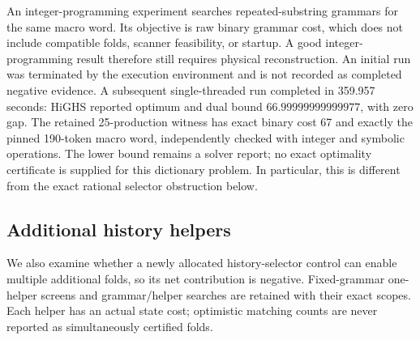 An integer-programming experiment searches repeated-substring grammars for the same macro word. Its objective is raw binary grammar cost, which does not include compatible folds, scanner feasibility, or startup. A good integer-programming result therefore still requires physical reconstruction. An initial run was terminated by the execution environment and is not recorded as completed negative evidence. A subsequent single-threaded run completed in 359.957 seconds: HiGHS reported optimum and dual bound $66.99999999999977$, with zero gap. The retained 25-production witness has exact binary cost 67 and exactly the pinned 190-token macro word, independently checked with integer and symbolic operations. The lower bound remains a solver report; no exact optimality certificate is supplied for this dictionary problem. In particular, this is different from the exact rational selector obstruction below.

\subsection{Additional history helpers}
We also examine whether a newly allocated history-selector control can enable multiple additional folds, so its net contribution is negative. Fixed-grammar one-helper screens and grammar/helper searches are retained with their exact scopes. Each helper has an actual state cost; optimistic matching counts are never reported as simultaneously certified folds.



